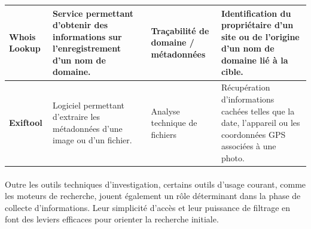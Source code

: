 \documentclass[memoire,12pt]{report}
\begin{document}
\begin{longtable}{|p{3cm}|p{4cm}|p{3cm}|p{5cm}|}
\textbf{Whois Lookup} &
Service permettant d’obtenir des informations sur l’enregistrement d’un nom de domaine. &
Traçabilité de domaine / métadonnées &
Identification du propriétaire d’un site ou de l’origine d’un nom de domaine lié à la cible. \\ \hline

\textbf{Exiftool} &
Logiciel permettant d’extraire les métadonnées d’une image ou d’un fichier. &
Analyse technique de fichiers &
Récupération d’informations cachées telles que la date, l’appareil ou les coordonnées GPS associées à une photo. \\ \hline

\end{longtable}

\paragraph{}Outre les outils techniques d’investigation, certains outils d’usage courant, comme les moteurs de recherche, jouent également un rôle déterminant dans la phase de collecte d’informations. Leur simplicité d’accès et leur puissance de filtrage en font des leviers efficaces pour orienter la recherche initiale.
\end{document}
